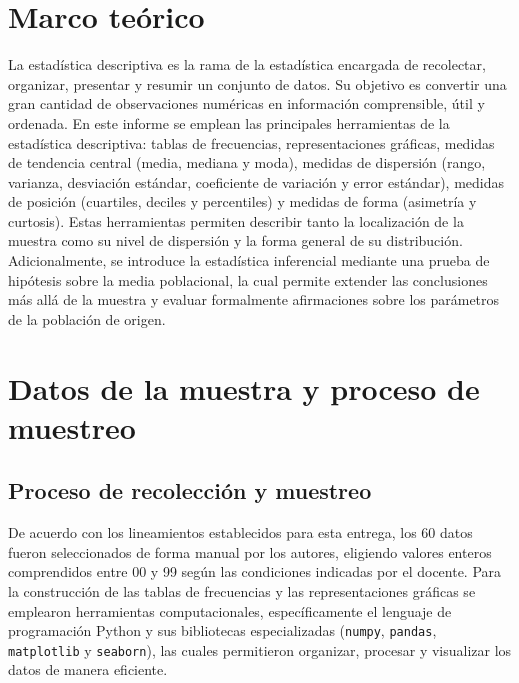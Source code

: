\documentclass[12pt,letterpaper]{article}
\begin{document}
\section{Marco teórico}

La estadística descriptiva es la rama de la estadística encargada de recolectar,
organizar, presentar y resumir un conjunto de datos. Su objetivo es convertir una
gran cantidad de observaciones numéricas en información comprensible, útil y ordenada.
En este informe se emplean las principales herramientas de la estadística descriptiva:
tablas de frecuencias, representaciones gráficas, medidas de tendencia central (media,
mediana y moda), medidas de dispersión (rango, varianza, desviación estándar,
coeficiente de variación y error estándar), medidas de posición (cuartiles, deciles
y percentiles) y medidas de forma (asimetría y curtosis). Estas herramientas permiten
describir tanto la localización de la muestra como su nivel de dispersión y la forma
general de su distribución. Adicionalmente, se introduce la estadística inferencial
mediante una prueba de hipótesis sobre la media poblacional, la cual permite extender
las conclusiones más allá de la muestra y evaluar formalmente afirmaciones sobre los
parámetros de la población de origen.

\section{Datos de la muestra y proceso de muestreo}

\subsection{Proceso de recolección y muestreo}

De acuerdo con los lineamientos establecidos para esta entrega, los 60 datos fueron
seleccionados de forma manual por los autores, eligiendo valores enteros comprendidos
entre 00 y 99 según las condiciones indicadas por el docente. Para la construcción de
las tablas de frecuencias y las representaciones gráficas se emplearon herramientas
computacionales, específicamente el lenguaje de programación Python y sus bibliotecas
especializadas (\texttt{numpy}, \texttt{pandas}, \texttt{matplotlib} y
\texttt{seaborn}), las cuales permitieron organizar, procesar y visualizar los datos
de manera eficiente.
\end{document}
